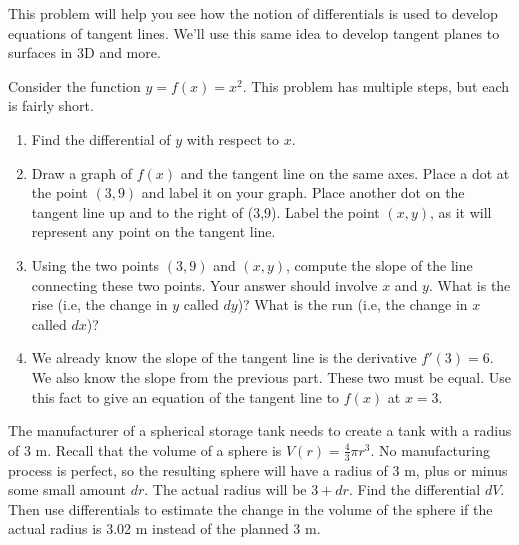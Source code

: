 This problem will help you see how the notion of differentials is used to develop equations of tangent lines. We'll use this same idea to develop tangent planes to surfaces in 3D and more.
\begin{problem} \label{differentials give tangent
    lines}
Consider the function $y=f(x) = x^2$. This problem has multiple steps, but each is fairly short.
\begin{enumerate}
\item Find the differential of $y$ with respect to $x$.  
\item Draw a graph of $f(x)$ and the tangent line on the same axes. Place a dot at the point $(3,9)$ and label it on your graph. Place another dot on the tangent line up and to the right of (3,9). Label the point $(x,y)$, as it will represent any point on the tangent line. 
\item Using the two points $(3,9)$ and $(x,y)$, compute the slope of the line connecting these two points. Your answer should involve $x$ and $y$. What is the rise (i.e, the change in $y$ called $dy$)? What is the run (i.e, the change in $x$ called $dx$)?  
\item We already know the slope of the tangent line is the derivative $f'(3)=6$. We also know the slope from the previous part. These two must be equal. Use this fact to give an equation of the tangent line to $f(x)$ at $x=3$. 
\end{enumerate}
\end{problem}
 
\begin{problem} 
	\label{diff-sphere}
The manufacturer of a spherical storage tank needs to create a tank with a radius of 3 m. Recall that the volume of a sphere is $V(r) = \frac{4}{3}\pi r^3$. No manufacturing process is perfect, so the resulting sphere will have a radius of 3 m, plus or minus some small amount $dr$. The actual radius will be $3+dr$. Find the differential $dV$.  Then use differentials to estimate the change in the volume of the sphere if the actual radius is 3.02 m instead of the planned 3 m.    
\end{problem}
 
